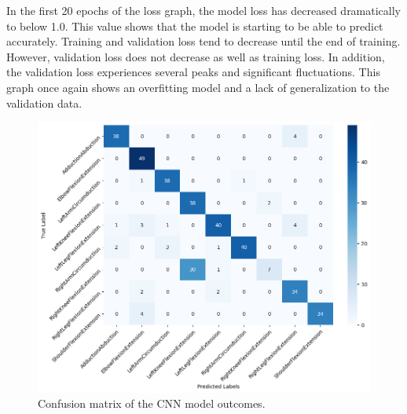 In the first 20 epochs of the loss graph, the model loss has decreased dramatically to below 1.0. This value shows that the model is starting to be able to predict accurately. Training and validation loss tend to decrease until the end of training. However, validation loss does not decrease as well as training loss. In addition, the validation loss experiences several peaks and significant fluctuations. This graph once again shows an overfitting model and a lack of generalization to the validation data.

\begin{figure}[h!]
	\centering
	\includegraphics[width=1\textwidth]{bab4/ar_CNN_Confmatrix.png}
	\caption{Confusion matrix of the CNN model outcomes.}
	\label{fig:CNN_Confmatrix}
\end{figure}

